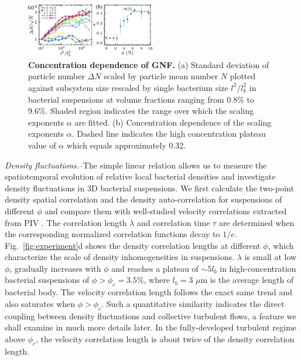 \documentclass[twocolumn,aps,prl,amsmath,amssymb,longbibliography]{revtex4-2}
\begin{document}
\begin{figure}[ht]
\begin{center}
\includegraphics[width=0.5\textwidth]{figures/GNF/v1.pdf}
\caption[Concentration dependence of GNF.]
{
\textbf{Concentration dependence of GNF.}
(a) Standard deviation of particle number $\Delta N$ scaled by particle mean number $N$ plotted against subsystem size rescaled by single bacterium size $l^2/l_b^2$ in bacterial suspensions at volume fractions ranging from 0.8\% to 9.6\%. Shaded region indicates the range over which the scaling exponents $\alpha$ are fitted.
(b) Concentration dependence of the scaling exponents $\alpha$. Dashed line indicates the high concentration plateau value of $\alpha$ which equals approximately 0.32.
}
\label{fig:GNF}
\end{center}
\end{figure}


\textit{Density fluctuations.}--The simple linear relation allows us to measure the spatiotemporal evolution of relative local bacterial densities and investigate density fluctuations in 3D bacterial suspensions. We first calculate the two-point density spatial correlation and the density auto-correlation for suspensions of different $\phi$ and compare them with well-studied velocity correlations extracted from PIV \cite{Liu2020}.
The correlation length $\lambda$ and correlation time $\tau$ are determined when the corresponding normalized correlation functions decay to $1/e$. Fig.~\ref{fig:experiment}d shows the density correlation lengths at different $\phi$, which characterize the scale of density inhomogeneities in suspensions.
$\lambda$ is small at low $\phi$, gradually increases with $\phi$ and reaches a plateau of $\sim 5l_b$ in high-concentration bacterial suspensions of $\phi > \phi_c = 3.5\%$, where $l_b=3$ $\mu$m is the average length of bacterial body. The velocity correlation length follows the exact same trend and also saturates when $\phi > \phi_c$. Such a quantitative similarity indicates the direct coupling between density fluctuations and collective turbulent flows, a feature we shall examine in much more details later. In the fully-developed turbulent regime above $\phi_c$, the velocity correlation length is about twice of the density correlation length.
\end{document}
